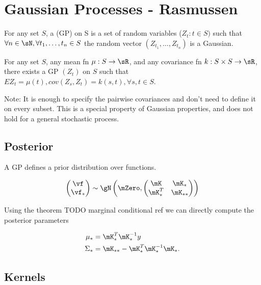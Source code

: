 \chapter{Gaussian Processes - Rasmussen}

\begin{defn}
  For any set $S$, a  (GP) on S is a set of random
  variables ($Z_t : t \in S)$ such that $\forall n \in \sN, \forall t_1, \dots,
  t_n \in S$ the random vector $(Z_{t_1}, \dots, Z_{t_n})$ is a Gaussian.
\end{defn}

\begin{thm}
  For any set $S$, any mean fn $\mu : S \rightarrow \sR$, and any covariance
  fn $k : S \times S \rightarrow \sR$, there exists a GP $(Z_t)$ on $S$ such
  that $E Z_t = \mu(t), cov(Z_s, Z_t) = k(s, t), \forall s,t \in S$.
\end{thm}

Note: It is enough to specify the pairwise covariances and don't need to define
it on every subset. This is a special property of Gaussian properties, and does
not hold for a general stochastic process. 

\section{Posterior}

A GP defines a prior distribution over functions.

\begin{equation}
  \begin{pmatrix}\vf \\ \vf_*\end{pmatrix} \sim \gN \left(\mZero, \begin{pmatrix}\mK & \mK_* \\ \mK^T_* & \mK_{**} \end{pmatrix} \right)
\end{equation}

Using the theorem {TODO marginal conditional ref} we can directly compute the
posterior parameters

\begin{align}
  \mu_* &= \mK_*^T \mK_*^{-1} y \\
  \Sigma_* &= \mK_{**} - \mK_*^T \mK_*^{-1} \mK_*.
\end{align}


\section{Kernels}

